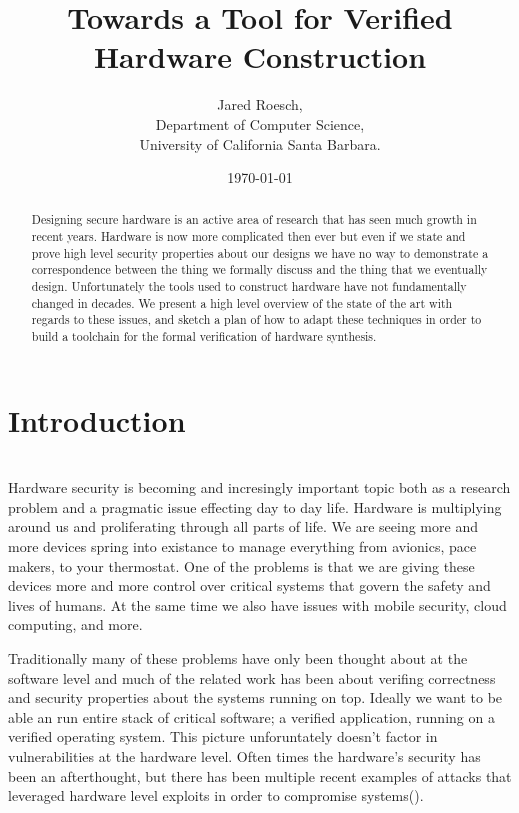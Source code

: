 \documentclass[12pt, titlepage]{article}
\title{Towards a Tool for Verified Hardware Construction}
\author{Jared Roesch,  \\
    Department of Computer Science, \\
    University of California Santa Barbara. \\
    }
\date{\today}
\begin{document}
\maketitle

\begin{abstract}
Designing secure hardware is an active area of research that has seen much growth in recent years.
Hardware is now more complicated then ever but even if we state and prove high level security 
properties about our designs we have no way to demonstrate a correspondence between the thing
we formally discuss and the thing that we eventually design. Unfortunately the tools used to construct hardware
have not fundamentally changed in decades. We present a high level overview of the state of the art with regards to these 
issues, and sketch a plan of how to adapt these techniques in order to build a toolchain for
the formal verification of hardware synthesis.
\end{abstract}


\section{Introduction}

 \\

Hardware security is becoming and incresingly important topic both as a research problem and a pragmatic issue effecting 
day to day life. Hardware is multiplying around us and proliferating through all parts of life. We are seeing more and more
devices spring into existance to manage everything from avionics, pace makers, to your thermostat. One of the problems is
that we are giving these devices more and more control over critical systems that govern the safety and lives of humans. At
the same time we also have issues with mobile security, cloud computing, and more.

Traditionally many of these problems have only been thought about at the software level and much of the related work has
been about verifing correctness and security properties about the systems running on top. Ideally we want to be able an
run entire stack of critical software; a verified application, running on a verified operating system. This picture
unforuntately doesn't factor in vulnerabilities at the hardware level. Often times the hardware's security has been
an afterthought, but there has been multiple recent examples of attacks that leveraged hardware level exploits in order
to compromise systems().
\end{document}
